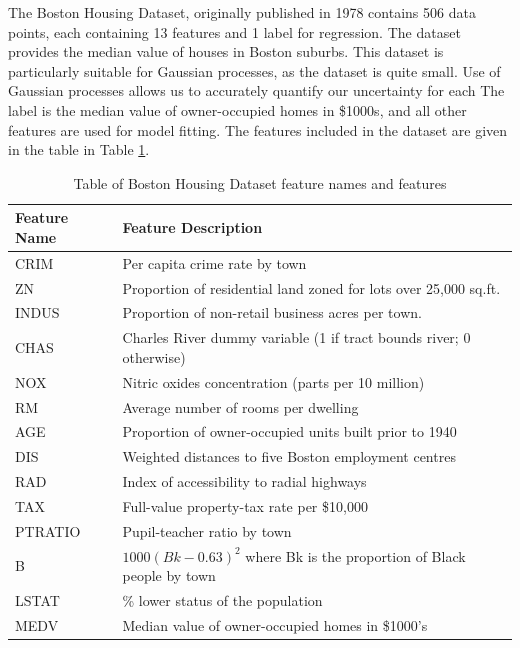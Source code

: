 \documentclass{article}
\begin{document}
The Boston Housing Dataset, originally published in 1978 contains 506 data points, each containing 13 features and 1
label for regression\cite{harrison_hedonic_1978}. The dataset provides the median value of houses in Boston suburbs.
This dataset is particularly suitable for Gaussian processes, as the dataset is quite small. Use of Gaussian processes
allows us to accurately quantify our uncertainty for each The label is the median value of owner-occupied homes in \$1000s, and
all other features are used for model fitting. The features included in the dataset are given in the table in Table
\ref{table:bhd_feat}.

\begin{table}[H]
  \centering
  \caption{Table of Boston Housing Dataset feature names and features}
  \begin{tabular}{ || m{3cm} | m{7cm} || }
    \hline
    \textbf{Feature Name} & \textbf{Feature Description} \\
    \hline \hline
    CRIM    & Per capita crime rate by town \\
    \hline
    ZN      & Proportion of residential land zoned for lots over 25,000 sq.ft. \\
    \hline
    INDUS   & Proportion of non-retail business acres per town. \\
    \hline
    CHAS    & Charles River dummy variable (1 if tract bounds river; 0 otherwise) \\
    \hline
    NOX     & Nitric oxides concentration (parts per 10 million) \\
    \hline
    RM      & Average number of rooms per dwelling \\
    \hline
    AGE     & Proportion of owner-occupied units built prior to 1940 \\
    \hline
    DIS     & Weighted distances to five Boston employment centres \\
    \hline
    RAD     & Index of accessibility to radial highways \\
    \hline
    TAX     & Full-value property-tax rate per \$10,000 \\
    \hline
    PTRATIO & Pupil-teacher ratio by town \\
    \hline
    B       & $1000(Bk - 0.63)^2$ where Bk is the proportion of Black people by town \\
    \hline
    LSTAT   & \% lower status of the population \\
    \hline
    MEDV    & Median value of owner-occupied homes in \$1000's \\
    \hline
  \end{tabular}
  \label{table:bhd_feat}
\end{table}
\end{document}

